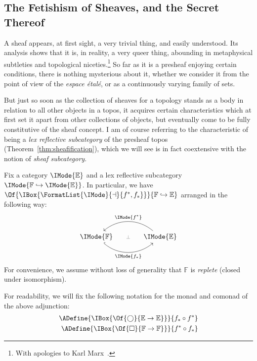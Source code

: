 \documentclass{article}
\newcommand\AreAdjoint[1]{\FormatList{\IMode}{\dashv}{#1}}
\begin{document}
\subsection{The Fetishism of Sheaves, and the Secret Thereof}

A sheaf appears, at first sight, a very trivial thing, and easily
understood. Its analysis shows that it is, in reality, a very queer
thing, abounding in metaphysical subtleties and topological
niceties.\footnote{With apologies to Karl
  Marx~\cite{marx:capital-vol-1}.} So far as it is a presheaf enjoying
certain conditions, there is nothing mysterious about it, whether we
consider it from the point of view of the \emph{espace \'etal\'e}, or
as a continuously varying family of sets.

But just so soon as the collection of sheaves for a topology stands as
a body in relation to all other objects in a topos, it acquires
certain characteristics which at first set it apart from other
collections of objects, but eventually come to be fully constitutive
of the sheaf concept. I am of course referring to the characteristic
of being a \emph{lex reflective subcategory} of the presheaf topos
(Theorem~\ref{thm:sheafification}), which we will see is in fact
coextensive with the notion of \emph{sheaf subcategory}.

Fix a category $\IMode{\mathbb{E}}$ and a lex reflective subcategory
$\IMode{\mathbb{F}\hookrightarrow\IMode{\mathbb{E}}}$. In
particular, we have
$\Of{\IBox{\AreAdjoint{f^*,f_*}}}{\mathbb{F}\hookrightarrow\mathbb{E}}$
arranged in the following way:
\[
  \begin{tikzcd}[sep=large]
    \IMode{\mathbb{F}}
    \arrow[r,phantom,"{\color{gray}\scriptstyle\bot}"]
    \arrow[r,hook,swap,bend right=40,"\IMode{f_*}"]
    &
    \IMode{\mathbb{E}}
    \arrow[l,swap,bend right=40,"\IMode{f^*}"]
  \end{tikzcd}
\]
For convenience, we assume without loss of generality that
$\mathbb{F}$ is \emph{replete} (closed under isomorphism).

\begin{notation}
  For readability, we will fix the following notation for the monad
  and comonad of the above adjunction:
  \begin{align*}
    \ADefine{
      \IBox{\Of{\bigcirc}{\mathbb{E}\to\mathbb{E}}}
    }{
      f_*\circ f^*
    }
    \\
    \ADefine{
      \IBox{\Of{\square}{\mathbb{F}\to\mathbb{F}}}
    }{
      f^*\circ f_*
    }
  \end{align*}
\end{notation}
\end{document}
